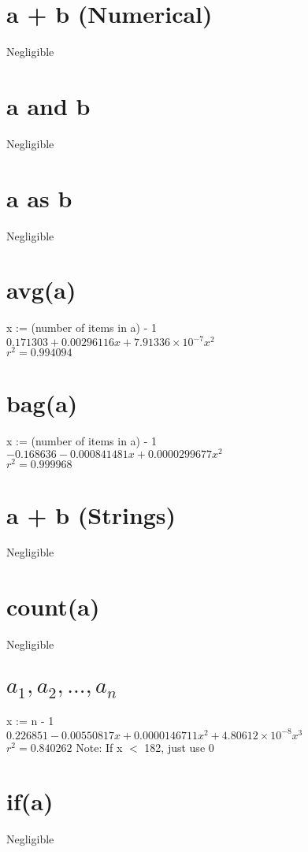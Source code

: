 \documentclass[12pt]{article}
\begin{document}
	\section{a + b (Numerical)}
	Negligible
	
	\section{a and b}
	Negligible
	
	\section{a as b}
	Negligible
	
	\section{avg(a)}
	x := (number of items in a) - 1\\
	$0.171303 + 0.00296116x + 7.91336 \times 10^{-7} x^2$\\
	$r^2 = 0.994094$

	\section{bag(a)}
	x := (number of items in a) - 1\\
	$-0.168636 - 0.000841481x + 0.0000299677x^2$\\
	$r^2 = 0.999968$
	
	\section{a + b (Strings)}
	Negligible
	
	\section{count(a)}
	Negligible
	
	\section{$a_1, a_2, ..., a_n$}
	x := n - 1\\
	$0.226851 - 0.00550817x + 0.0000146711x^2 + 4.80612 \times 10^{-8} x^3$\\
	$r^2 = 0.840262$
	Note: If x $<$ 182, just use 0
	
	\section{if(a)}
	Negligible
	
\end{document}
